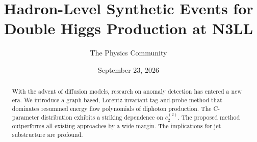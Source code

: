 \documentclass[11pt]{article}
\title{Hadron-Level Synthetic Events for Double Higgs Production at N3LL}
\author{The Physics Community}
\date{September 23, 2026}
\numberwithin{equation}{section}
\theoremstyle{definition}
\theoremstyle{remark}
\begin{document}
\maketitle
\begin{abstract}
With the advent of diffusion models, research on anomaly detection has
entered a new era. We introduce a graph-based, Lorentz-invariant
tag-and-probe method that dominates resummed energy flow polynomials of
diphoton production. The C-parameter distribution exhibits a striking
dependence on $e_2^{(2)}$. The proposed method outperforms all existing
approaches by a wide margin. The implications for jet substructure are
profound.
\end{abstract}
\tableofcontents



\nocite{*}


\end{document}
